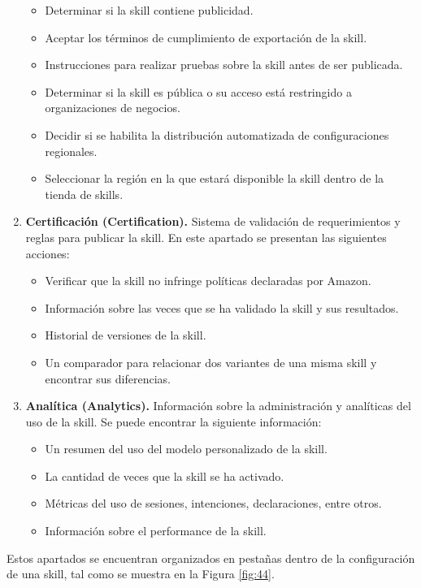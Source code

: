 \begin{enumerate}
\begin{itemize}
    \item Determinar si la skill contiene publicidad.
    \item Aceptar los términos de cumplimiento de exportación de la skill.
    \item Instrucciones para realizar pruebas sobre la skill antes de ser publicada.
    \item Determinar si la skill es pública o su acceso está restringido a organizaciones de negocios.
    \item Decidir si se habilita la distribución automatizada de configuraciones regionales.
    \item Seleccionar la región en la que estará disponible la skill dentro de la tienda de skills.
  \end{itemize}
  \item \textbf{Certificación (Certification).} Sistema de validación de requerimientos y reglas para publicar la skill. En este apartado se presentan las siguientes acciones:
  \begin{itemize}
    \item Verificar que la skill no infringe políticas declaradas por Amazon.
    \item Información sobre las veces que se ha validado la skill y sus resultados.
    \item Historial de versiones de la skill.
    \item Un comparador para relacionar dos variantes de una misma skill y encontrar sus diferencias.
  \end{itemize}
  \item \textbf{Analítica (Analytics).} Información sobre la administración y analíticas del uso de la skill. Se puede encontrar la siguiente información:
  \begin{itemize}
    \item Un resumen del uso del modelo personalizado de la skill.
    \item La cantidad de veces que la skill se ha activado.
    \item Métricas del uso de sesiones, intenciones, declaraciones, entre otros.
    \item Información sobre el performance de la skill.
  \end{itemize}
\end{enumerate}

Estos apartados se encuentran organizados en pestañas dentro de la configuración de una skill, tal como se muestra en la Figura \ref{fig:44}.

